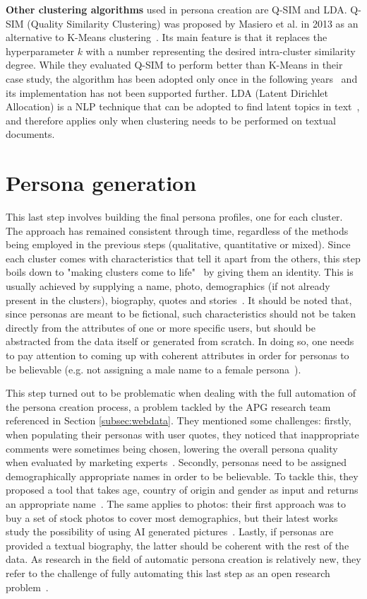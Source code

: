 \textbf{Other clustering algorithms} used in persona creation are Q-SIM and LDA. Q-SIM (Quality Similarity Clustering) was proposed by Masiero et al. in 2013 as an alternative to K-Means clustering~\cite{masiero2013automa}. Its main feature is that it replaces the hyperparameter $k$ with a number representing the desired intra-cluster similarity degree. While they evaluated Q-SIM to perform better than K-Means in their case study, the algorithm has been adopted only once in the following years~\cite{dos2014behavioral} and its implementation has not been supported further. LDA (Latent Dirichlet Allocation) is a NLP technique that can be adopted to find latent topics in text~\cite{bamman2013learning}, and therefore applies only when clustering needs to be performed on textual documents.

\section{Persona generation}
\label{sec:generation}
This last step involves building the final persona profiles, one for each cluster. The approach has remained consistent through time, regardless of the methods being employed in the previous steps (qualitative, quantitative or mixed). Since each cluster comes with characteristics that tell it apart from the others, this step boils down to "making clusters come to life"~\cite{mulder2007approaches} by giving them an identity. This is usually achieved by supplying a name, photo, demographics (if not already present in the clusters), biography, quotes and stories~\cite{mulder2007approaches}. It should be noted that, since personas are meant to be fictional, such characteristics should not be taken directly from the attributes of one or more specific users, but should be abstracted from the data itself or generated from scratch. In doing so, one needs to pay attention to coming up with coherent attributes in order for personas to be believable (e.g. not assigning a male name to a female persona~\cite{jung2021all}).

This step turned out to be problematic when dealing with the full automation of the persona creation process, a problem tackled by the APG research team referenced in Section \ref{subsec:webdata}. They mentioned some challenges: firstly, when populating their personas with user quotes, they noticed that inappropriate comments were sometimes being chosen, lowering the overall persona quality when evaluated by marketing experts~\cite{salminen2019future}. Secondly, personas need to be assigned demographically appropriate names in order to be believable. To tackle this, they proposed a tool that takes age, country of origin and gender as input and returns an appropriate name~\cite{jung2021all}. The same applies to photos: their first approach was to buy a set of stock photos to cover most demographics, but their latest works study the possibility of using AI generated pictures~\cite{salminen2020using}. Lastly, if personas are provided a textual biography, the latter should be coherent with the rest of the data. As research in the field of automatic persona creation is relatively new, they refer to the challenge of fully automating this last step as an open research problem~\cite{salminen2019future, salminen2021survey}.


